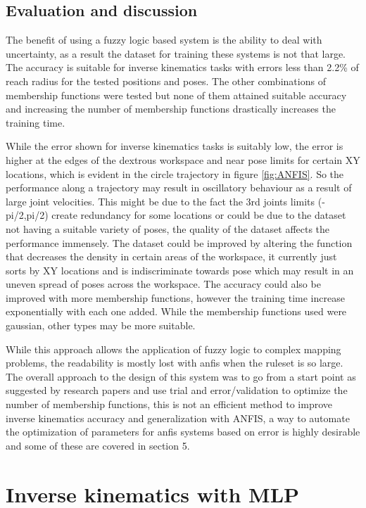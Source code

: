 \documentclass[a4paper,11pt]{article}
\begin{document}
\subsection{Evaluation and discussion}
The benefit of using a fuzzy logic based system is the ability to deal with uncertainty, as a result the dataset for training these systems is not that large. The accuracy is suitable for inverse kinematics tasks with errors less than 2.2\% of reach radius for the tested positions and poses. The other combinations of membership functions were tested but none of them attained suitable accuracy and increasing the number of membership functions drastically increases the training time.

While the error shown for inverse kinematics tasks is suitably low, the error is higher at the edges of the dextrous workspace and near pose limits for certain XY locations, which is evident in the circle trajectory in figure \ref{fig:ANFIS}. So the performance along a trajectory may result in oscillatory behaviour as a result of large joint velocities.
This might be due to the fact the 3rd joints limits (-pi/2,pi/2) create redundancy for some locations or could be due to the dataset not having a suitable variety of poses, the quality of the dataset affects the performance immensely. The dataset could be improved by altering the function that decreases the density in certain areas of the workspace, it currently just sorts by XY locations and is indiscriminate towards pose which may result in an uneven spread of poses across the workspace.
The accuracy could also be improved with more membership functions, however the training time increase exponentially with each one added. While the membership functions used were gaussian, other types may be more suitable.

While this approach allows the application of fuzzy logic to complex mapping problems, the readability is mostly lost with anfis when the ruleset is so large.
The overall approach to the design of this system was to go from a start point as suggested by research papers and use trial and error/validation to optimize the number of membership functions, this is not an efficient method to improve inverse kinematics accuracy and generalization with ANFIS, a way to automate the optimization of parameters for anfis systems based on error is highly desirable and some of these are covered in section 5.




\section{Inverse kinematics with MLP}
\end{document}
